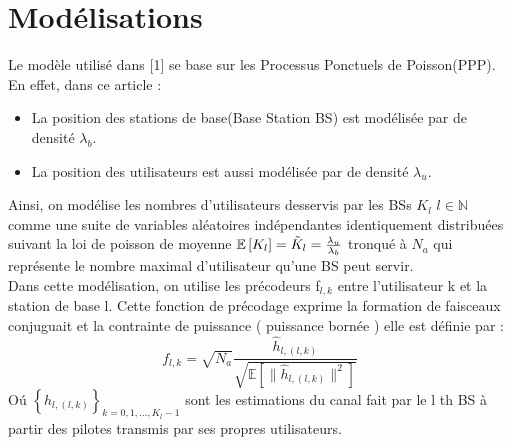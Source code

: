 \documentclass[12pt,onecolumn]{article}
\begin{document}
\section{Modélisations}
Le modèle utilisé dans {\color{blue}{ Massive MIMO Forward Link Analysis for Cellular Network}}[1] se base sur les Processus Ponctuels de Poisson(PPP). En effet, dans ce article :
\begin{itemize}
  \item La position des stations de base(Base Station BS) est modélisée par {} de densité  $\lambda_b$.
  \item La position des utilisateurs est aussi modélisée par {} de densité  $\lambda_u$. 
\end{itemize}
Ainsi, on modélise les nombres d'utilisateurs desservis par les BSs ${K_l}$ $l \in \mathbb{N}$ comme une suite de variables aléatoires indépendantes identiquement distribuées suivant la loi de poisson de moyenne $\mathbb{E}\left[K_l\right]=\Tilde{K}_l=\frac{\lambda_u}{\lambda_b} $ tronqué à $N_a$ qui représente le nombre maximal d'utilisateur qu'une BS peut servir.\\[0.2cm]
Dans cette modélisation, on utilise les précodeurs f$_{l,k}$ entre l'utilisateur k et la station de base l. Cette fonction de précodage exprime la formation de faisceaux conjuguait et la contrainte de puissance ( puissance bornée ) elle est définie par : $$f_{l,k} = \sqrt{N_a}\frac{\hat{h}_{l,(l,k)}}{\sqrt{\mathbb{E}\left[\|\hat{h}_{l,(l,k)}\|^2\right]}}$$ 
O\'u $\left\lbrace \hat{h}_{l, (l,k)} \right\rbrace_{k=0,1,...,K_l-1}$ sont les estimations du canal fait par le l th BS à partir des pilotes transmis par ses propres utilisateurs.

\printbibliography
\end{document}
